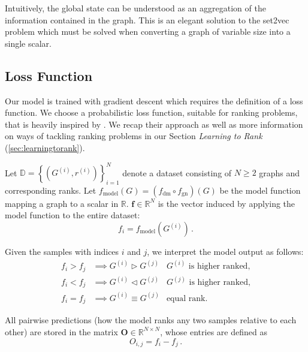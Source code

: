 Intuitively, the global state can be understood as an aggregation of the information contained in the graph. This is an elegant solution to the set2vec problem which must be solved when converting a graph of variable size into a single scalar.

\subsection{Loss Function}
\label{sec:loss}

Our model is trained with gradient descent which requires the definition of a loss function. We choose a probabilistic loss function, suitable for ranking problems, that is heavily inspired by \cite{Burges:learningtorankwithsgd}. We recap their approach as well as more information on ways of tackling ranking problems in our Section \textit{Learning to Rank} (\ref{sec:learningtorank}).

Let $\mathbb{D}=\left\{\left(G^{(i)},r^{(i)}\right)\right\}_{i=1}^N$ denote a dataset consisting of $N\ge2$ graphs and corresponding ranks.
Let $f_\text{model}(G)=\left(f_\text{dm}\circ f_\text{gn}\right)\left(G\right)$ be the model function mapping a graph to a scalar in $\mathbb{R}$.
$\bm{f}\in\mathbb{R}^N$ is the vector induced by applying the model function to the entire dataset:
\begin{equation}
    f_i=f_\text{model}\left(G^{(i)}\right)\,.
\end{equation}

Given the samples with indices $i$ and $j$, we interpret the model output as follows:
\begin{align}
    f_i>f_j&\implies G^{(i)}\triangleright G^{(j)}&G^{(i)}\text{ is higher ranked,}\\
    f_i<f_j&\implies G^{(i)}\triangleleft G^{(j)}&G^{(j)}\text{ is higher ranked,}\\
    f_i=f_j&\implies G^{(i)}\equiv G^{(j)}&\text{equal rank.}
\end{align}

All pairwise predictions (how the model ranks any two samples relative to each other) are stored in the matrix $\bm{O}\in\mathbb{R}^{N\times N}$, whose entries are defined as
\begin{equation}\label{eq:outputmatrix}
    O_{i,j}=f_i-f_j\,.
\end{equation}

